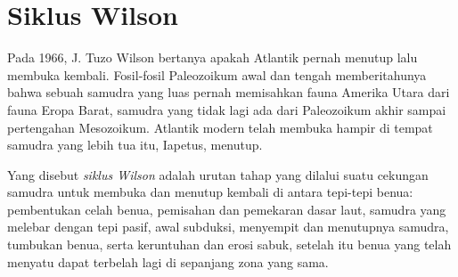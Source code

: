 \begin{omfigure}
\par{}
\end{omfigure}

\section{Siklus Wilson}\label{sec:b2:wilson-cycle:cycle}

Pada 1966, J. Tuzo Wilson bertanya apakah Atlantik pernah menutup lalu
membuka kembali. Fosil-fosil Paleozoikum awal dan tengah memberitahunya bahwa sebuah samudra yang luas pernah
memisahkan fauna Amerika Utara dari fauna Eropa Barat, samudra yang tidak lagi
ada dari Paleozoikum akhir sampai pertengahan Mesozoikum. Atlantik modern telah membuka
hampir di tempat samudra yang lebih tua itu, Iapetus, menutup.

\begin{definition}\label{def:b2:wilson-cycle:wilson}
Yang disebut \emph{siklus Wilson} adalah urutan tahap yang dilalui suatu
cekungan samudra untuk membuka dan menutup kembali di antara tepi-tepi benua: pembentukan celah benua,
pemisahan dan pemekaran dasar laut, samudra yang melebar dengan tepi pasif, awal
subduksi, menyempit dan menutupnya samudra, tumbukan benua, serta keruntuhan
dan erosi sabuk, setelah itu benua yang telah menyatu dapat terbelah lagi di sepanjang zona yang sama.
\end{definition}

